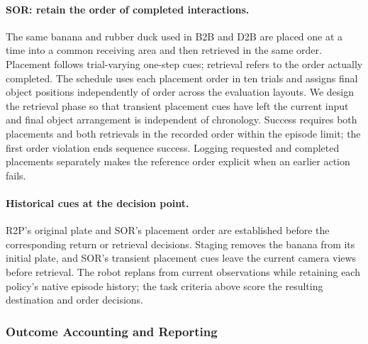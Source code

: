 \paragraph{SOR: retain the order of completed interactions.}
The same banana and rubber duck used in B2B and D2B are placed one at a time into a common receiving area and then retrieved in the same order.
Placement follows trial-varying one-step cues; retrieval refers to the order actually completed.
The schedule uses each placement order in ten trials and assigns final object positions independently of order across the evaluation layouts.
We design the retrieval phase so that transient placement cues have left the current input and final object arrangement is independent of chronology.
Success requires both placements and both retrievals in the recorded order within the episode limit; the first order violation ends sequence success.
Logging requested and completed placements separately makes the reference order explicit when an earlier action fails.

\paragraph{Historical cues at the decision point.}
R2P's original plate and SOR's placement order are established before the corresponding return or retrieval decisions.
Staging removes the banana from its initial plate, and SOR's transient placement cues leave the current camera views before retrieval.
The robot replans from current observations while retaining each policy's native episode history; the task criteria above score the resulting destination and order decisions.

\subsubsection{Outcome Accounting and Reporting}
\label{app:realworld_results}

